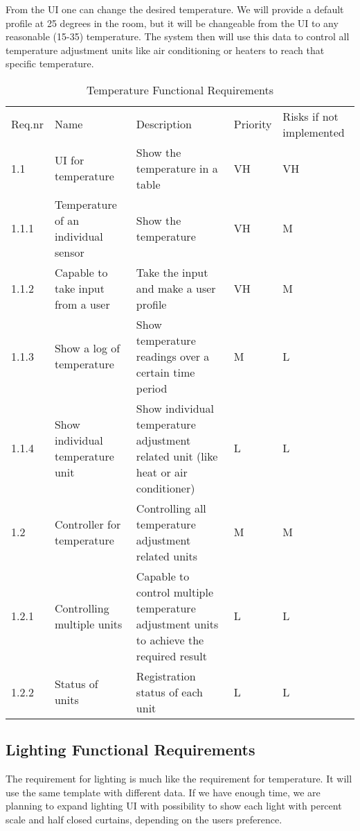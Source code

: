 \documentclass[../document]{subfiles}
\begin{document}
From the UI one can change the desired temperature. We will provide a default profile at 25 degrees in the room, but it will be changeable from the UI to any reasonable (15-35) temperature. The system then will use this data to control all temperature adjustment units like air conditioning or heaters to reach that specific temperature.

\begin{table}[H]
\caption{Temperature Functional Requirements}
\centering
\begin{tabularx}{\textwidth}{|l|X|X|l|X|}
\hline
\\ \hline Req.nr
&Name
&Description
&Priority
&Risks if not implemented
\\ \hline 1.1
&UI for temperature
&Show the temperature in a table
&VH
&VH
\\ \hline 1.1.1
&Temperature of an individual sensor
&Show the temperature 
&VH
&M
\\ \hline 1.1.2
&Capable to take input from a user
&Take the input and make a user profile
&VH
&M
\\ \hline 1.1.3
&Show a log of temperature
&Show temperature readings over a certain time period
&M
&L
\\ \hline 1.1.4
&Show individual temperature unit
&Show individual temperature adjustment related unit (like heat or air conditioner)
&L
&L
\\ \hline 1.2
&Controller for temperature
&Controlling all temperature adjustment related units
&M
&M
\\ \hline 1.2.1
&Controlling multiple units
&Capable to control multiple temperature adjustment units to achieve the required result
&L
&L
\\ \hline 1.2.2
&Status of units
&Registration status of each unit
&L
&L
\\ \hline 
\end{tabularx}
\end{table}

\subsection{Lighting Functional Requirements}

The requirement for lighting is much like the requirement for temperature. It will use the same template with different data. If we have enough time, we are planning to expand lighting UI with possibility to show each light with percent scale and half closed curtains, depending on the users preference.
\end{document}
